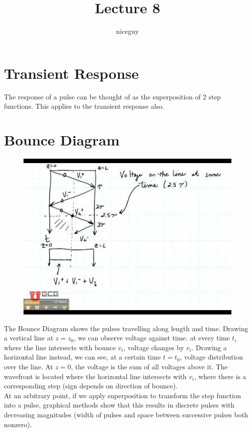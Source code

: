 \documentclass[12pt]{article}
\title{Lecture 8}
\author{niceguy}
\begin{document}
\maketitle

\section{Transient Response}

The response of a pulse can be thought of as the superposition of 2 step functions. This applies to the transient response also.

\section{Bounce Diagram}

\begin{figure}[h]
    \begin{center}
        \includegraphics[scale=0.5]{bounce.jpg}
    \end{center}
\end{figure}

The Bounce Diagram shows the pulses travelling along length and time. Drawing a vertical line at $z = z_0$, we can observe voltage against time. at every time $t_i$ where the line intersects with bounce $v_i$, voltage changes by $v_i$. Drawing a horizontal line instead, we can see, at a certain time $t=t_0$, voltage distribution over the line. At $z = 0$, the voltage is the sum of all voltages above it. The wavefront is located where the horizontal line intersects with $v_i$, where there is a corresponding step (sign depends on direction of bounce). \\
At an arbitrary point, if we apply superposition to transform the step function into a pulse, graphical methods show that this results in discrete pulses with decreasing magnitudes (width of pulses and space between successive pulses both nonzero). 
\end{document}
